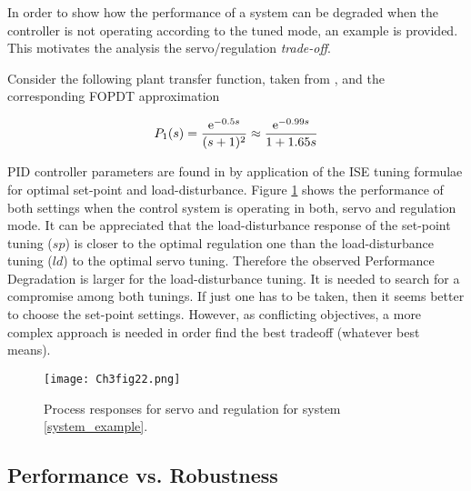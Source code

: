In order to show how the performance of a system can be degraded when the controller is not operating according to the tuned mode, an example is provided. This motivates the analysis the servo/regulation \emph{trade-off}.

Consider the following plant transfer function, taken from \citet{zhuang1993}, and the corresponding FOPDT
approximation 

\begin{equation}
P_1(s)=\frac{\mathrm{e}^{-0.5s}}{(s+1)^2} \approx \frac{\mathrm{e}^{-0.99s}}{1+1.65s} \label{system_example} 
\end{equation}

PID controller parameters are found in \citet{zhuang1993} by application of the ISE tuning formulae for optimal set-point and load-disturbance. Figure \ref{ch3:fig:example1} shows the performance of both settings when the control system is operating in both, servo and regulation mode. It can be appreciated that the load-disturbance response of the set-point tuning ($sp$) is closer to the optimal regulation one than the load-disturbance tuning ($ld$) to the optimal servo tuning. Therefore the observed Performance Degradation is larger for the load-disturbance tuning. It is needed to search for a compromise among both tunings. If just one has to be taken, then it seems better to choose the set-point settings. However, as conflicting objectives, a more complex approach is needed in order find the best tradeoff (whatever best means).

\begin{figure}[tb]
    \begin{center}
        \texttt{[image: Ch3fig22.png]}
        \caption{Process responses for servo and regulation for system \ref{system_example}.}
        \label{ch3:fig:example1}
    \end{center}
\end{figure}


\subsection{Performance vs. Robustness}

